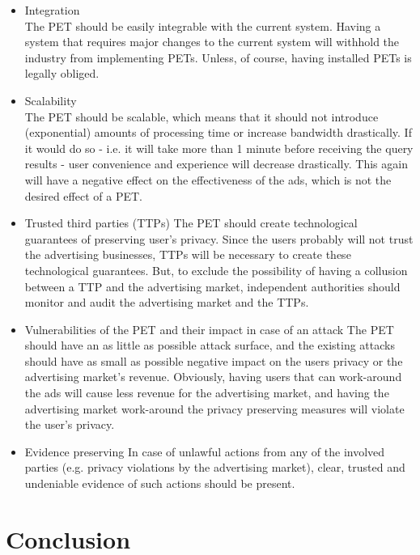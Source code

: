 \documentclass[11pt]{article}
\begin{document}
\begin{itemize}
	\item Integration\\
		The PET should be easily integrable with the current system. Having a system that requires major changes to the current system will withhold the industry from implementing PETs. Unless, of course, having installed PETs is legally obliged.

	\item Scalability\\
		The PET should be scalable, which means that it should not introduce (exponential) amounts of processing time or increase bandwidth drastically. If it would do so - i.e. it will take more than 1 minute before receiving the query results - user convenience and experience will decrease drastically. This again will have a negative effect on the effectiveness of the ads, which is not the desired effect of a PET.

	\item Trusted third parties (TTPs)
		The PET should create technological guarantees of preserving user's privacy. Since the users probably will not trust the advertising businesses, TTPs will be necessary to create these technological guarantees. But, to exclude the possibility of having a collusion between a TTP and the advertising market, independent authorities should monitor and audit the advertising market and the TTPs.

	\item Vulnerabilities of the PET and their impact in case of an attack
		The PET should have an as little as possible attack surface, and the existing attacks should have as small as possible negative impact on the users privacy or the advertising market's revenue. Obviously, having users that can work-around the ads will cause less revenue for the advertising market, and having the advertising market work-around the privacy preserving measures will violate the user's privacy.

	\item Evidence preserving
		In case of unlawful actions from any of the involved parties (e.g. privacy violations by the advertising market), clear, trusted and undeniable evidence of such actions should be present. 
\end{itemize}

\section{Conclusion}



\end{document}
